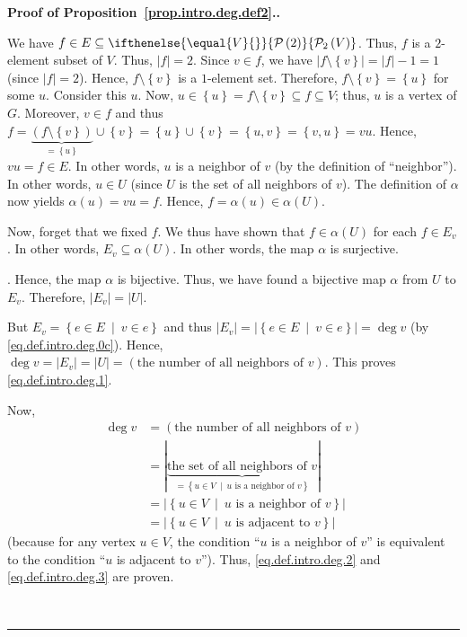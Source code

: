 \documentclass[numbers=enddot,12pt,final,onecolumn,notitlepage]{scrartcl}%
\theoremstyle{definition}
\newenvironment{proof}[1][Proof]{\noindent\textbf{#1.} }{\ \rule{0.5em}{0.5em}}
\newcommand{\powset}[2][]{\ifthenelse{\equal{#2}{}}{\mathcal{P}\left(#1\right)}{\mathcal{P}_{#1}\left(#2\right)}}
\newcommand{\set}[1]{\left\{ #1 \right\}}
\newcommand{\abs}[1]{\left| #1 \right|}
\newcommand{\tup}[1]{\left( #1 \right)}
\begin{document}
\begin{proof}[Proof of Proposition~\ref{prop.intro.deg.def2}.]
{We have $f \in E \subseteq \powset[2]{V}$. Thus, $f$ is a $2$-element
subset of $V$. Thus, $\abs{f} = 2$. Since $v \in f$, we have
$\abs{f \setminus \set{v}} = \abs{f} - 1 = 1$ (since $\abs{f} = 2$).
Hence, $f \setminus \set{v}$ is a $1$-element set. Therefore,
$f \setminus \set{v} = \set{u}$ for some $u$. Consider this $u$. Now,
$u \in \set{u} = f \setminus \set{v} \subseteq f \subseteq V$; thus,
$u$ is a vertex of $G$. Moreover, $v \in f$ and thus
$f = \underbrace{\tup{f \setminus \set{v}}}_{= \set{u}} \cup \set{v}
= \set{u} \cup \set{v} = \set{u, v} = \set{v, u} = vu$. Hence,
$vu = f \in E$. In other words, $u$ is a neighbor of $v$ (by the
definition of ``neighbor''). In other words, $u \in U$ (since $U$ is
the set of all neighbors of $v$). The definition of $\alpha$ now
yields $\alpha\tup{u} = vu = f$. Hence, $f = \alpha\tup{u} \in
\alpha\tup{U}$.

Now, forget that we fixed $f$. We thus have shown that
$f \in \alpha\tup{U}$ for each $f \in E_v$. In other words, $E_v
\subseteq \alpha\tup{U}$. In other words, the map $\alpha$ is
surjective.}. Hence, the map $\alpha$ is bijective. Thus, we have
found a bijective map $\alpha$ from $U$ to $E_v$. Therefore,
$\abs{E_v} = \abs{U}$.

But $E_v = \set{e \in E \ \mid \ v \in e }$ and thus
$\abs{E_v} = \abs{\set{e \in E \ \mid \ v \in e }} = \deg v$
(by \eqref{eq.def.intro.deg.0c}). Hence,
$\deg v = \abs{E_v} = \abs{U}
= \left(\text{the number of all neighbors of } v\right)$. This proves
\eqref{eq.def.intro.deg.1}.

Now,
\begin{align*}
\deg v &= \left(\text{the number of all neighbors of } v\right) \\
&= \abs{\underbrace{\text{the set of all neighbors of } v }_{
         = \set{u \in V \ \mid \ u \text{ is a neighbor of } v }}} \\
&= \abs{\set{u \in V \ \mid \ u \text{ is a neighbor of } v }} \\
&= \abs{\set{u \in V \ \mid \ u \text{ is adjacent to } v }}
\end{align*}
(because for any vertex $u \in V$, the condition
``$u$ is a neighbor of $v$'' is equivalent to the condition
``$u$ is adjacent to $v$''). Thus, \eqref{eq.def.intro.deg.2} and
\eqref{eq.def.intro.deg.3} are proven.


\end{proof}
\end{document}
